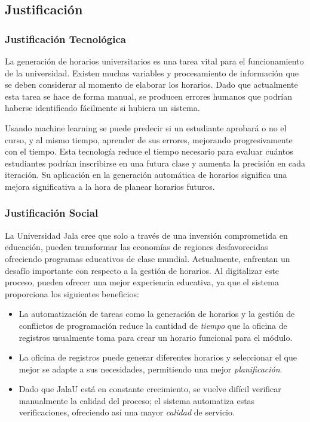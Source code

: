 \subsection{Justificación}

\subsubsection{Justificación Tecnológica}
La generación de horarios universitarios es una tarea vital para el funcionamiento de la universidad.
Existen muchas variables y procesamiento de información que se deben considerar al momento de elaborar los horarios.
Dado que actualmente esta tarea se hace de forma manual, se producen errores humanos que podrían haberse identificado fácilmente si hubiera un sistema.

Usando machine learning se puede predecir si un estudiante aprobará o no el curso, y al mismo tiempo, aprender de sus errores, mejorando progresivamente con el tiempo.
Esta tecnología reduce el tiempo necesario para evaluar cuántos estudiantes podrían inscribirse en una futura clase y aumenta la precisión en cada iteración.
Su aplicación en la generación automática de horarios significa una mejora significativa a la hora de planear horarios futuros.

\subsubsection{Justificación Social}
La Universidad Jala cree que solo a través de una inversión comprometida en educación, pueden transformar las economías de regiones desfavorecidas ofreciendo programas educativos de clase mundial.
Actualmente, enfrentan un desafío importante con respecto a la gestión de horarios.
Al digitalizar este proceso, pueden ofrecer una mejor experiencia educativa, ya que el sistema proporciona los siguientes beneficios:

\begin{itemize}
    \item La automatización de tareas como la generación de horarios y la gestión de conflictos de programación reduce la cantidad de \textit{tiempo} que la oficina de registros usualmente toma para crear un horario funcional para el módulo.
    \item La oficina de registros puede generar diferentes horarios y seleccionar el que mejor se adapte a sus necesidades, permitiendo una mejor \textit{planificación}.
    \item Dado que JalaU está en constante crecimiento, se vuelve difícil verificar manualmente la calidad del proceso; el sistema automatiza estas verificaciones, ofreciendo así una mayor \textit{calidad} de servicio.
\end{itemize}

